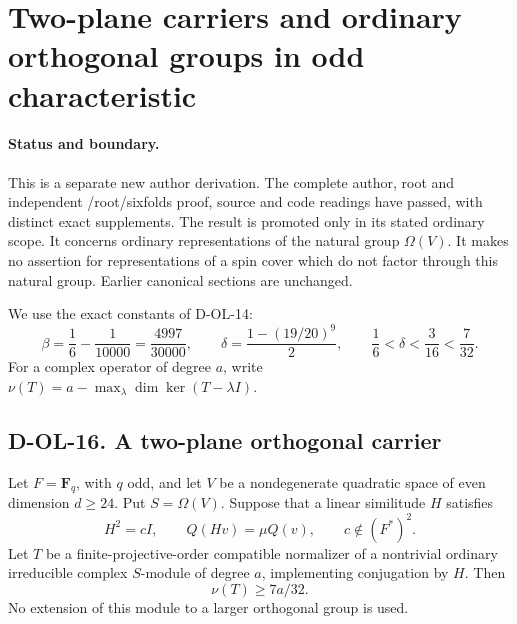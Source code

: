 \section{Two-plane carriers and ordinary orthogonal groups in odd characteristic}
\label{sec:orthogonal-even-odd}

\paragraph{Status and boundary.}
This is a separate new author derivation.  The complete author, root and independent /root/sixfolds
proof, source and code readings have passed, with distinct exact
supplements. The result is promoted only in its stated ordinary scope.  It concerns
ordinary representations of the natural group $\Omega(V)$.  It makes
no assertion for representations of a spin cover which do not factor
through this natural group.  Earlier canonical sections are unchanged.

We use the exact constants of D-OL-14:
\[
 \beta=\frac16-\frac1{10000}=\frac{4997}{30000},\qquad
 \delta=\frac{1-(19/20)^9}{2},\qquad
 \frac16<\delta<\frac3{16}<\frac7{32}.
 \tag{OE.1}
\]
For a complex operator of degree $a$, write
$\nu(T)=a-\max_\lambda\dim\ker(T-\lambda I)$.

\subsection*{D-OL-16. A two-plane orthogonal carrier}

\begin{lemma}[D-OL-16]
Let $F=\mathbf F_q$, with $q$ odd, and let $V$ be a nondegenerate
quadratic space of even dimension $d\ge24$.  Put $S=\Omega(V)$.
Suppose that a linear similitude $H$ satisfies
\[
       H^2=cI,\qquad Q(Hv)=\mu Q(v),\qquad
       c\notin(F^*)^2.
       \tag{OE.2}
\]
Let $T$ be a finite-projective-order compatible normalizer of a
nontrivial ordinary irreducible complex $S$-module of degree $a$,
implementing conjugation by $H$.  Then
\[
                              \nu(T)\ge7a/32.
                              \tag{OE.3}
\]
No extension of this module to a larger orthogonal group is used.
\end{lemma}

